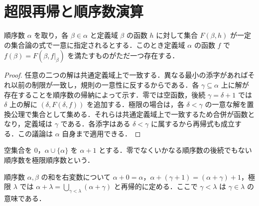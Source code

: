 \section{超限再帰と順序数演算}
\begin{prop}[集合値に限定しない超限再帰]
順序数 $\alpha$ を取り，各 $\beta\in\alpha$ と定義域 $\beta$ の函数 $h$ に対して集合 $F(\beta,h)$ が一定の集合論の式で一意に指定されるとする．このとき定義域 $\alpha$ の函数 $f$ で $f(\beta)=F(\beta,f|_\beta)$ を満たすものがただ一つ存在する．
\end{prop}
\begin{proof}
任意の二つの解は共通定義域上で一致する．異なる最小の添字があればそれ以前の制限が一致し，規則の一意性に反するからである．各 $\gamma\subseteq\alpha$ 上に解が存在することを順序数の帰納によって示す．零では空函数，後続 $\gamma=\delta+1$ では $\delta$ 上の解に $(\delta,F(\delta,f))$ を追加する．極限の場合は，各 $\delta<\gamma$ の一意な解を置換公理で集合として集める．それらは共通定義域上で一致するため合併が函数となり，定義域は $\gamma$ である．各添字はある $\delta<\gamma$ に属するから再帰式も成立する．この議論は $\alpha$ 自身まで適用できる．
\end{proof}
\begin{defn}
空集合を $0$，$\alpha\cup\{\alpha\}$ を $\alpha+1$ とする．零でなくいかなる順序数の後続でもない順序数を極限順序数という．
\end{defn}
\begin{defn}[順序数の加法]
順序数 $\alpha,\beta$ の和を右変数について $\alpha+0=\alpha$，$\alpha+(\gamma+1)=(\alpha+\gamma)+1$，極限 $\lambda$ では $\alpha+\lambda=\bigcup_{\gamma<\lambda}(\alpha+\gamma)$ と再帰的に定める．ここで $\gamma<\lambda$ は $\gamma\in\lambda$ の意味である．
\end{defn}
